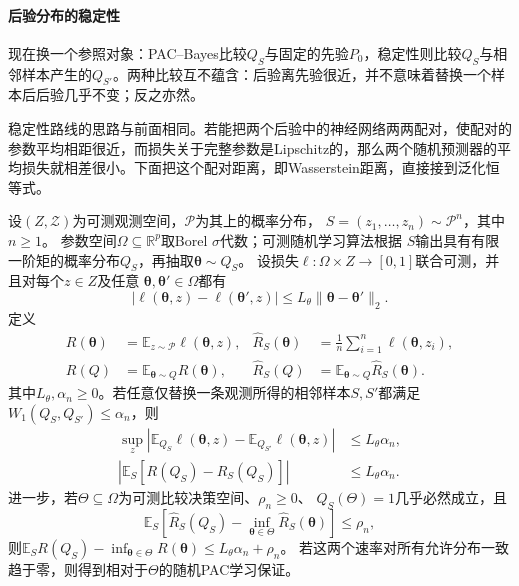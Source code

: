 \paragraph{后验分布的稳定性}

现在换一个参照对象：PAC--Bayes比较$Q_S$与固定的先验$P_0$，稳定性则比较$Q_S$与相邻样本产生的$Q_{S'}$。两种比较互不蕴含：后验离先验很近，并不意味着替换一个样本后后验几乎不变；反之亦然。

稳定性路线的思路与前面相同。若能把两个后验中的神经网络两两配对，使配对的参数平均相距很近，而损失关于完整参数是Lipschitz的，那么两个随机预测器的平均损失就相差很小。下面把这个配对距离，即Wasserstein距离，直接接到泛化恒等式。

\begin{theorem}[参数分布稳定性与期望泛化差]
\label{thm:distribution-stability-generalization}
设$(Z,\mathcal Z)$为可测观测空间，$\mathcal P$为其上的概率分布，
$S=(z_1,\ldots,z_n)\sim\mathcal P^n$，其中$n\geq1$。
参数空间$\Omega\subseteq\mathbb R^p$取Borel $\sigma$代数；可测随机学习算法根据
$S$输出具有有限一阶矩的概率分布$Q_S$，再抽取$\bm\theta\sim Q_S$。
设损失$\ell:\Omega\times Z\to[0,1]$联合可测，并且对每个$z\in Z$及任意
$\bm\theta,\bm\theta'\in\Omega$都有
\[
 |\ell(\bm\theta,z)-\ell(\bm\theta',z)|
 \leq L_\theta\|\bm\theta-\bm\theta'\|_2.
\]
定义
\[
 \begin{aligned}
 R(\bm\theta)&=\mathbb E_{z\sim\mathcal P}\ell(\bm\theta,z),&
 \hat R_S(\bm\theta)&=\frac1n\sum_{i=1}^n\ell(\bm\theta,z_i),\\
 R(Q)&=\mathbb E_{\bm\theta\sim Q}R(\bm\theta),&
 \hat R_S(Q)&=\mathbb E_{\bm\theta\sim Q}\hat R_S(\bm\theta).
 \end{aligned}
\]
其中$L_\theta,\alpha_n\geq0$。若任意仅替换一条观测所得的相邻样本$S,S'$都满足
$W_1(Q_S,Q_{S'})\leq\alpha_n$，则
\[
 \begin{aligned}
 \sup_z\left|\mathbb E_{Q_S}\ell(\bm\theta,z)
              -\mathbb E_{Q_{S'}}\ell(\bm\theta,z)\right|
 &\leq L_\theta\alpha_n,\\
 \left|\mathbb E_S[R(Q_S)-\hat R_S(Q_S)]\right|
 &\leq L_\theta\alpha_n.
 \end{aligned}
\]
进一步，若$\Theta\subseteq\Omega$为可测比较决策空间、$\rho_n\geq0$、
$Q_S(\Theta)=1$几乎必然成立，且
\[
 \mathbb E_S\left[\hat R_S(Q_S)-\inf_{\bm\theta\in\Theta}
                           \hat R_S(\bm\theta)\right]\leq\rho_n,
\]
则$\mathbb E_S R(Q_S)-\inf_{\bm\theta\in\Theta}R(\bm\theta)
\leq L_\theta\alpha_n+\rho_n$。
若这两个速率对所有允许分布一致趋于零，则得到相对于$\Theta$的随机PAC学习保证。
\end{theorem}
